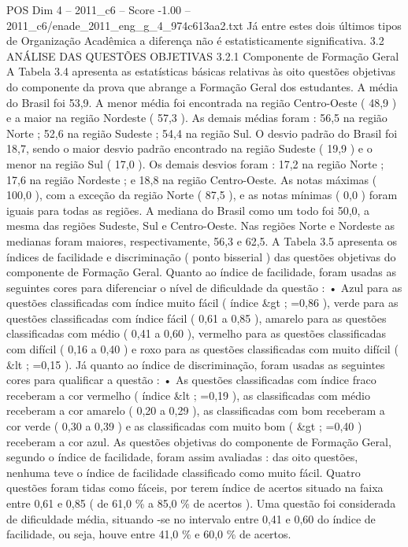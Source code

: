 \begin{textsample}{POS Dim 4 – 2011\_c6 – Score -1.00 – 2011\_c6/enade\_2011\_eng\_g\_4\_974c613aa2.txt}
Já entre estes dois últimos tipos de Organização Acadêmica a diferença não é estatisticamente significativa. 3.2 ANÁLISE DAS QUESTÕES OBJETIVAS 3.2.1 Componente de Formação Geral A Tabela 3.4 apresenta as estatísticas básicas relativas às oito questões objetivas do componente da prova que abrange a Formação Geral dos estudantes.
A média do Brasil foi 53,9.
A menor média foi encontrada na região Centro-Oeste ( 48,9 ) e a maior na região Nordeste ( 57,3 ).
As demais médias foram : 56,5 na região Norte ; 52,6 na região Sudeste ; 54,4 na região Sul.
O desvio padrão do Brasil foi 18,7, sendo o maior desvio padrão encontrado na região Sudeste ( 19,9 ) e o menor na região Sul ( 17,0 ).
Os demais desvios foram : 17,2 na região Norte ; 17,6 na região Nordeste ; e 18,8 na região Centro-Oeste.
As notas máximas ( 100,0 ), com a exceção da região Norte ( 87,5 ), e as notas mínimas ( 0,0 ) foram iguais para todas as regiões.
A mediana do Brasil como um todo foi 50,0, a mesma das regiões Sudeste, Sul e Centro-Oeste.
Nas regiões Norte e Nordeste as medianas foram maiores, respectivamente, 56,3 e 62,5.
A Tabela 3.5 apresenta os índices de facilidade e discriminação ( ponto bisserial ) das questões objetivas do componente de Formação Geral.
Quanto ao índice de facilidade, foram usadas as seguintes cores para diferenciar o nível de dificuldade da questão : • Azul para as questões classificadas com índice muito fácil ( índice \&gt ; =0,86 ), verde para as questões classificadas com índice fácil ( 0,61 a 0,85 ), amarelo para as questões classificadas com médio ( 0,41 a 0,60 ), vermelho para as questões classificadas com difícil ( 0,16 a 0,40 ) e roxo para as questões classificadas com muito difícil ( \&lt ; =0,15 ).
Já quanto ao índice de discriminação, foram usadas as seguintes cores para qualificar a questão : • As questões classificadas com índice fraco receberam a cor vermelho ( índice \&lt ; =0,19 ), as classificadas com médio receberam a cor amarelo ( 0,20 a 0,29 ), as classificadas com bom receberam a cor verde ( 0,30 a 0,39 ) e as classificadas com muito bom ( \&gt ; =0,40 ) receberam a cor azul.
As questões objetivas do componente de Formação Geral, segundo o índice de facilidade, foram assim avaliadas : das oito questões, nenhuma teve o índice de facilidade classificado como muito fácil.
Quatro questões foram tidas como fáceis, por terem índice de acertos situado na faixa entre 0,61 e 0,85 ( de 61,0 \% a 85,0 \% de acertos ).
Uma questão foi considerada de dificuldade média, situando -se no intervalo entre 0,41 e 0,60 do índice de facilidade, ou seja, houve entre 41,0 \% e 60,0 \% de acertos.

\end{textsample}
